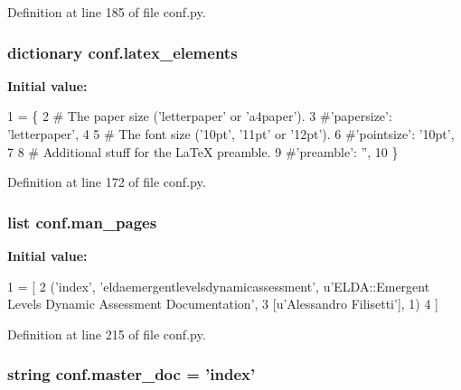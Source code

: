 Definition at line 185 of file conf.\-py.

\hypertarget{a00132_a33619d385ad23765ac6ebb58bf82d43d}{
\subsubsection[{latex\-\_\-elements}]{\setlength{\rightskip}{0pt plus 5cm}dictionary conf.\-latex\-\_\-elements}}\label{a00132_a33619d385ad23765ac6ebb58bf82d43d}
{\bfseries Initial value\-:}
\begin{DoxyCode}
1 = \{
2 \textcolor{comment}{# The paper size ('letterpaper' or 'a4paper').}
3 \textcolor{comment}{#'papersize': 'letterpaper',}
4 
5 \textcolor{comment}{# The font size ('10pt', '11pt' or '12pt').}
6 \textcolor{comment}{#'pointsize': '10pt',}
7 
8 \textcolor{comment}{# Additional stuff for the LaTeX preamble.}
9 \textcolor{comment}{#'preamble': '',}
10 \}
\end{DoxyCode}


Definition at line 172 of file conf.\-py.

\hypertarget{a00132_a85efc5fee48a26fa2d651f6eeb38fc2b}{
\subsubsection[{man\-\_\-pages}]{\setlength{\rightskip}{0pt plus 5cm}list conf.\-man\-\_\-pages}}\label{a00132_a85efc5fee48a26fa2d651f6eeb38fc2b}
{\bfseries Initial value\-:}
\begin{DoxyCode}
1 = [
2     (\textcolor{stringliteral}{'index'}, \textcolor{stringliteral}{'eldaemergentlevelsdynamicassessment'}, \textcolor{stringliteral}{u'ELDA::Emergent Levels Dynamic Assessment
       Documentation'},
3      [\textcolor{stringliteral}{u'Alessandro Filisetti'}], 1)
4 ]
\end{DoxyCode}


Definition at line 215 of file conf.\-py.

\hypertarget{a00132_a6fcd7e5236f355b1e1a55f9d95988810}{
\subsubsection[{master\-\_\-doc}]{\setlength{\rightskip}{0pt plus 5cm}string conf.\-master\-\_\-doc = '{\bf index}'}}\label{a00132_a6fcd7e5236f355b1e1a55f9d95988810}


